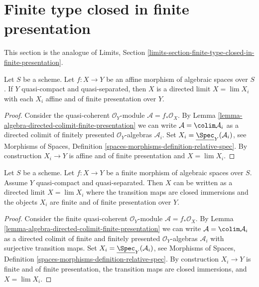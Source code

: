 \section{Finite type closed in finite presentation}
\label{section-finite-type-closed-in-finite-presentation}

\noindent
This section is the analogue of
Limits, Section \ref{limits-section-finite-type-closed-in-finite-presentation}.

\begin{lemma}
\label{lemma-affine-morphism-is-limit}
Let $S$ be a scheme. Let $f : X \to Y$ be an affine morphism of algebraic
spaces over $S$. If $Y$ quasi-compact and
quasi-separated, then $X$ is a directed limit $X = \lim X_i$
with each $X_i$ affine and of finite presentation over $Y$.
\end{lemma}

\begin{proof}
Consider the quasi-coherent $\mathcal{O}_Y$-module
$\mathcal{A} = f_*\mathcal{O}_X$. By
Lemma \ref{lemma-algebra-directed-colimit-finite-presentation}
we can write $\mathcal{A} = \colim \mathcal{A}_i$ as a directed
colimit of finitely presented
$\mathcal{O}_Y$-algebras $\mathcal{A}_i$.
Set $X_i = \underline{\Spec}_Y(\mathcal{A}_i)$, see
Morphisms of Spaces, Definition
\ref{spaces-morphisms-definition-relative-spec}.
By construction $X_i \to Y$ is affine and of finite presentation
and $X = \lim X_i$.
\end{proof}

\begin{lemma}
\label{lemma-finite-in-finite-and-finite-presentation}
Let $S$ be a scheme. Let $f : X \to Y$ be a finite morphism of algebraic
spaces over $S$. Assume $Y$ quasi-compact and quasi-separated.
Then $X$ can be written as a directed limit $X = \lim X_i$
where the transition maps are closed immersions and the objects
$X_i$ are finite and of finite presentation over $Y$.
\end{lemma}

\begin{proof}
Consider the finite quasi-coherent $\mathcal{O}_Y$-module
$\mathcal{A} = f_*\mathcal{O}_X$. By
Lemma \ref{lemma-algebra-directed-colimit-finite-presentation}
we can write $\mathcal{A} = \colim \mathcal{A}_i$ as a directed
colimit of finite and finitely presented $\mathcal{O}_Y$-algebras
$\mathcal{A}_i$ with surjective transition maps.
Set $X_i = \underline{\Spec}_Y(\mathcal{A}_i)$, see
Morphisms of Spaces, Definition
\ref{spaces-morphisms-definition-relative-spec}.
By construction $X_i \to Y$ is finite and of finite presentation,
the transition maps are closed immersions, and $X = \lim X_i$.
\end{proof}

